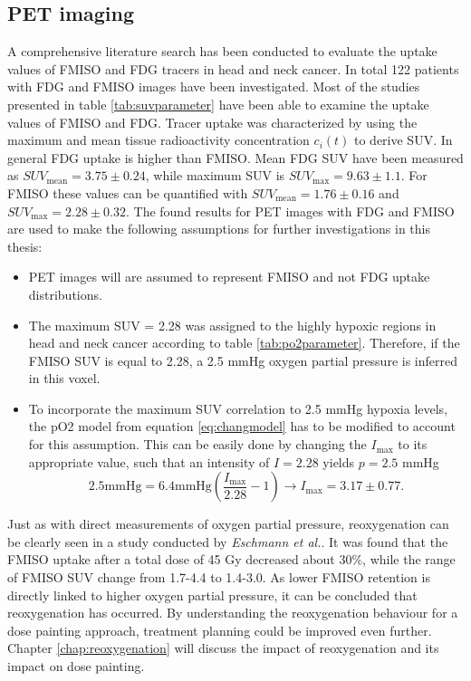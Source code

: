 \subsection{PET imaging}\label{chap:petimaging}
A comprehensive literature search has been conducted to evaluate the uptake values of FMISO and FDG tracers in head and neck cancer. In total 122 patients with FDG and FMISO images have been investigated. Most of the studies presented in table \ref{tab:suvparameter} have been able to examine the uptake values of FMISO and FDG. Tracer uptake was characterized by using the maximum and mean tissue radioactivity concentration $c_i(t)$ to derive SUV. In general FDG uptake is higher than FMISO. Mean FDG SUV have been measured as $SUV_\mathrm{mean}=3.75 \pm 0.24$, while maximum SUV is  $SUV_\mathrm{max}=9.63 \pm 1.1$. For FMISO these values can be quantified with $SUV_\mathrm{mean}=1.76 \pm 0.16$ and $SUV_\mathrm{max}=2.28 \pm 0.32$. The found results for PET images with FDG and FMISO are used to make the following assumptions for further investigations in this thesis:
\begin{itemize}
\item PET images will are assumed to represent FMISO and not FDG uptake distributions.
\item The maximum SUV = 2.28 was assigned to the highly hypoxic regions in head and neck cancer according to table \ref{tab:po2parameter}. Therefore, if the FMISO SUV is equal to 2.28, a 2.5 mmHg oxygen partial pressure is inferred in this voxel.
\item To incorporate the maximum SUV correlation to 2.5 mmHg hypoxia levels, the pO2 model from equation \ref{eq:changmodel} has to be modified to account for this assumption. This can be easily done by changing the $I_\mathrm{max}$ to its  appropriate value, such that an intensity of $I=2.28$ yields $p=2.5$ mmHg
\begin{equation}\label{eq:gaugedchang}
2.5\mathrm{mmHg} = 6.4\mathrm{mmHg}\left(\frac{I_\mathrm{max}}{2.28}-1\right) \rightarrow I_\mathrm{max} = 3.17 \pm 0.77.
\end{equation}
\end{itemize}
Just as with direct measurements of oxygen partial pressure, reoxygenation can be clearly seen in a study conducted by \textit{Eschmann et al.}\cite{pmid17543402}. It was found that the FMISO uptake after a total dose of 45 Gy decreased about 30\%, while the range of FMISO SUV change from 1.7-4.4 to 1.4-3.0. As lower FMISO retention is directly linked to higher oxygen partial pressure, it can be concluded that reoxygenation has occurred. By understanding the reoxygenation behaviour for a dose painting approach, treatment planning could be improved even further. Chapter \ref{chap:reoxygenation} will discuss the impact of reoxygenation and its impact on dose painting.
